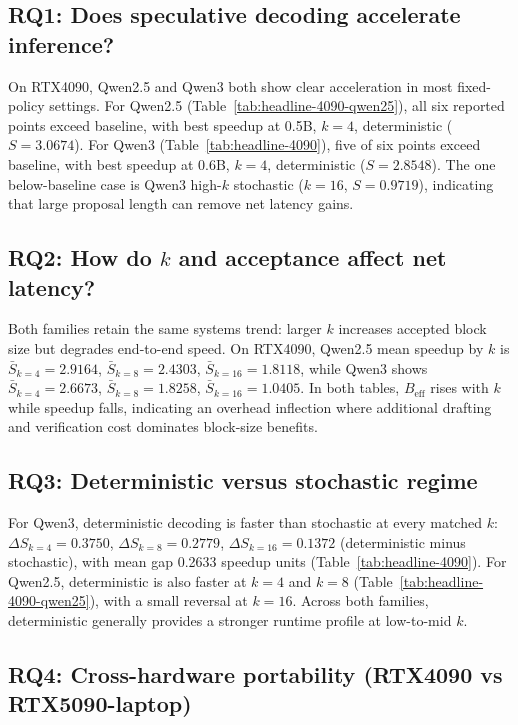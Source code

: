 \subsection{RQ1: Does speculative decoding accelerate inference?}

On RTX4090, Qwen2.5 and Qwen3 both show clear acceleration in most fixed-policy
settings. For Qwen2.5 (Table~\ref{tab:headline-4090-qwen25}), all six reported
points exceed baseline, with best speedup at 0.5B, $k{=}4$, deterministic
($S{=}3.0674$). For Qwen3 (Table~\ref{tab:headline-4090}), five of six points
exceed baseline, with best speedup at 0.6B, $k{=}4$, deterministic
($S{=}2.8548$). The one below-baseline case is Qwen3 high-$k$ stochastic
($k{=}16$, $S{=}0.9719$), indicating that large proposal length can remove net
latency gains.

\subsection{RQ2: How do $k$ and acceptance affect net latency?}

Both families retain the same systems trend: larger $k$ increases accepted
block size but degrades end-to-end speed. On RTX4090, Qwen2.5 mean speedup by
$k$ is $\bar{S}_{k=4}=2.9164$, $\bar{S}_{k=8}=2.4303$,
$\bar{S}_{k=16}=1.8118$, while Qwen3 shows
$\bar{S}_{k=4}=2.6673$, $\bar{S}_{k=8}=1.8258$,
$\bar{S}_{k=16}=1.0405$. In both tables, $B_{\text{eff}}$ rises with $k$
while speedup falls, indicating an overhead inflection where additional
drafting and verification cost dominates block-size benefits.

\subsection{RQ3: Deterministic versus stochastic regime}

For Qwen3, deterministic decoding is faster than stochastic at every matched
$k$: $\Delta S_{k=4}{=}0.3750$, $\Delta S_{k=8}{=}0.2779$,
$\Delta S_{k=16}{=}0.1372$ (deterministic minus stochastic), with mean gap
0.2633 speedup units (Table~\ref{tab:headline-4090}).
For Qwen2.5, deterministic is also faster at $k{=}4$ and $k{=}8$
(Table~\ref{tab:headline-4090-qwen25}), with a small reversal at $k{=}16$.
Across both families, deterministic generally provides a stronger runtime
profile at low-to-mid $k$.

\subsection{RQ4: Cross-hardware portability (RTX4090 vs RTX5090-laptop)}

